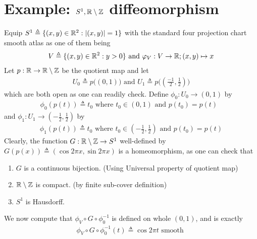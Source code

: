 \documentclass{report}
\begin{document}
\section{Example: $S^1,\mathbb{R}\setminus \mathbb{Z}$ diffeomorphism } 
\begin{mdframed}
Equip $S^1\triangleq \{ (x,y)\in\mathbb{R}^2: \left|(x,y)\right|=1 \}$ with the standard four projection chart smooth atlas  as one of them being
\begin{align*}
V\triangleq  \{ (x,y)\in\mathbb{R}^2: y>0 \}\text{ and }\varphi_V: V\rightarrow \mathbb{R}; (x,y)\mapsto  x
\end{align*}
Let $p:\mathbb{R}\rightarrow \mathbb{R}\setminus \mathbb{Z}$  be the quotient map and let 
\begin{align*}
U_0\triangleq p\Big((0,1)\Big)\text{ and }U_1\triangleq p\Big((\frac{-1}{2},\frac{1}{2})\Big)
\end{align*}
which are both open as one can readily check. Define $\phi_0:U_0\rightarrow (0,1)$ by 
\begin{align*}
\phi_0 (p(t))\triangleq t_0\text{ where $t_0\in (0,1)$ and $p(t_0)=p(t)$ }
\end{align*}
and $\phi_1:U_1\rightarrow (-\frac{1}{2},\frac{1}{2})$ by
\begin{align*}
\phi_1(p(t))\triangleq t_0\text{ where }t_0 \in (-\frac{1}{2},\frac{1}{2})\text{ and }p(t_0)=p(t)
\end{align*}
Clearly, the function $G:\mathbb{R}\setminus \mathbb{Z}\rightarrow S^1$ well-defined by $G(p(x))\triangleq (\cos 2\pi x, \sin 2\pi x)$ is a homeomorphism, as one can check that 
\begin{enumerate}[label=(\alph*)]
  \item $G$ is a continuous bijection. (Using Universal property of quotient map)
  \item $\mathbb{R}\setminus \mathbb{Z}$ is compact. (by finite sub-cover definition)
  \item $S^1$ is Hausdorff.
\end{enumerate}
We now compute that $\phi_V\circ G\circ \phi_0^{-1}$ is defined on whole $(0,1)$, and is exactly 
\begin{align*}
\phi_V\circ G\circ \phi_0^{-1}(t)\triangleq \cos 2\pi t\text{ smooth }
\end{align*}
\end{mdframed}
\end{document}
